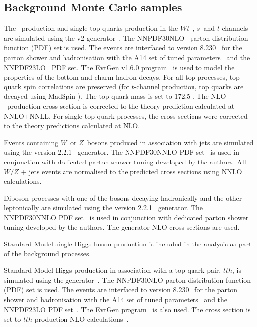 \subsection{Background Monte Carlo samples}
\label{sec:data_backgrounds}

The \ttbar\ production and single top-quarks production in the $Wt$~, $s$~and $t$-channels are simulated using the \POWHEGBOX v2 generator~\cite{Powheg1, Powheg2, Powheg3}. The NNPDF30NLO~\cite{NNPDF} parton distribution function (PDF) set is used. The events are interfaced to  version  8.230~\cite{PYTHIA82} for the parton shower and hadronisation with the A14 set of tuned parameters~\cite{A14tune, ATLAS:2012uec} and the NNPDF23LO~\cite{NNPDF23PDFSet} PDF set. The EvtGen v1.6.0 program~\cite{EvtGen} is used to model the properties of the bottom and charm hadron decays. For all top processes, top-quark spin correlations are preserved (for $t$-channel production, top quarks are decayed using MadSpin \cite{MadSpin}). The top-quark mass is set to 172.5 \GeV.  The NLO \ttbar\ production cross section is corrected to the theory prediction calculated at NNLO+NNLL. For single top-quark processes, the cross sections were corrected to the theory predictions calculated at NLO.
 
Events containing $W$\ or $Z$\ bosons produced in association with jets are simulated using the \SHERPA version 2.2.1~\cite{Bothmann:2019yzt} generator. The NNPDF30NNLO PDF set~\cite{NNPDF} is used in conjunction with dedicated parton shower tuning developed by the \SHERPA authors.  All $W/Z$ + jets events are normalised to the predicted cross sections using NNLO calculations.

Diboson processes with one of the bosons decaying hadronically and the other leptonically are simulated using the \SHERPA version 2.2.1~\cite{Bothmann:2019yzt} generator. The NNPDF30NNLO PDF set~\cite{NNPDF} is used in conjunction with dedicated parton shower tuning developed by the \SHERPA authors. The generator NLO cross sections are used.

Standard Model single Higgs boson production is included in the analysis as part of the background processes. 

Standard Model Higgs production in association with a top-quark pair, $tth$, is simulated using the \POWHEGBOX generator~\cite{Powheg1, Powheg2, Powheg3}. The NNPDF30NLO parton distribution function (PDF) set is used. The events are interfaced to  version  8.230~\cite{PYTHIA82} for the parton shower and hadronisation with the A14 set of tuned parameters~\cite{A14tune, ATLAS:2012uec} and the NNPDF23LO PDF set~\cite{NNPDF23PDFSet}. The EvtGen program~\cite{EvtGen} is also used. The cross section is set to $tth$ production NLO calculations~\cite{Hxsec}.


